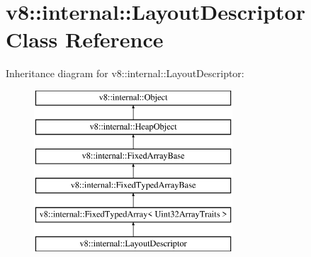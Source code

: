 \hypertarget{classv8_1_1internal_1_1_layout_descriptor}{}\section{v8\+:\+:internal\+:\+:Layout\+Descriptor Class Reference}
\label{classv8_1_1internal_1_1_layout_descriptor}
Inheritance diagram for v8\+:\+:internal\+:\+:Layout\+Descriptor\+:\begin{figure}[H]
\begin{center}
\leavevmode
\includegraphics[height=6.000000cm]{classv8_1_1internal_1_1_layout_descriptor}
\end{center}
\end{figure}
